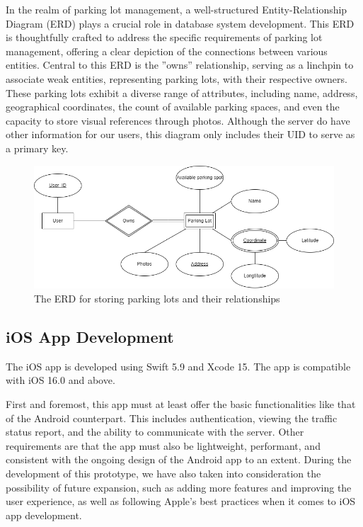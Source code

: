 
In the realm of parking lot management, a well-structured Entity-Relationship Diagram (ERD) plays a crucial role in database system development. This ERD is thoughtfully crafted to address the specific requirements of parking lot management, offering a clear depiction of the connections between various entities. Central to this ERD is the ”owns” relationship, serving as a linchpin to associate weak entities, representing parking lots, with their respective owners. These parking lots exhibit a diverse range of attributes, including name, address, geographical coordinates, the count of available parking spaces, and even the capacity to store visual references through photos. Although the server do have other information for our users, this diagram only includes their UID to serve as a primary key.

\begin{figure}[H]
    \centering
    \includegraphics[width=\linewidth]{assets/images/Implementation/Parking/Parking ERD.drawio.png}
    \caption{The ERD for storing parking lots and their relationships}
    \label{fig:parking_erd}
\end{figure}

\subsection{iOS App Development}
The iOS app is developed using Swift 5.9 and Xcode 15. The app is compatible with iOS 16.0 and above.

First and foremost, this app must at least offer the basic functionalities like that of the Android counterpart. This includes authentication, viewing the traffic status report, and the ability to communicate with the server. Other requirements are that the app must also be lightweight, performant, and consistent with the ongoing design of the Android app to an extent. During the development of this prototype, we have also taken into consideration the possibility of future expansion, such as adding more features and improving the user experience, as well as following Apple's best practices when it comes to iOS app development.

